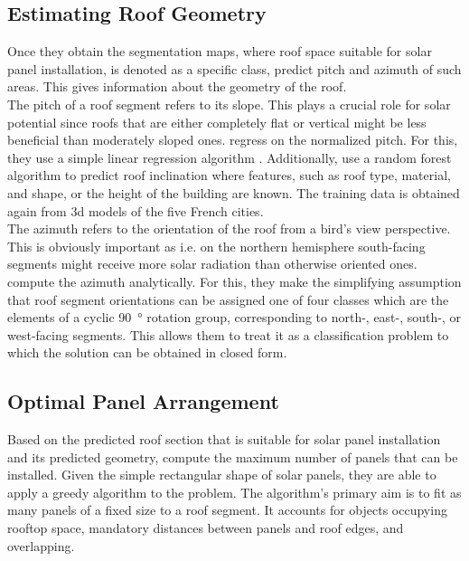 \documentclass{article} %
\begin{document}
\subsection*{Estimating Roof Geometry}
Once they obtain the segmentation maps, where roof space suitable for solar panel installation, is denoted as a specific class, \citet{de2021predicting} predict pitch and azimuth of such areas. This gives information about the geometry of the roof.\\
The pitch of a roof segment refers to its slope. This plays a crucial role for solar potential since roofs that are either completely flat or vertical might be less beneficial than moderately sloped ones. \citet{de2021predicting} regress on the normalized pitch. For this, they use a simple linear regression algorithm \cite{gross2003linear}. Additionally,\citet{de2021predicting} use a random forest algorithm \cite{belgiu2016random} to predict roof inclination where features, such as roof type, material, and shape, or the height of the building are known. The training data is obtained again from 3d models of the five French cities.\\
The azimuth refers to the orientation of the roof from a bird's view perspective. This is obviously important as i.e. on the northern hemisphere south-facing segments might receive more solar radiation than otherwise oriented ones.\\ \citet{de2021predicting} compute the azimuth analytically. For this, they make the simplifying assumption that roof segment orientations can be assigned one of four classes which are the elements of a cyclic \SI{90}{\degree} rotation group, corresponding to north-, east-, south-, or west-facing segments. This allows them to treat it as a classification problem to which the solution can be obtained in closed form.

\subsection*{Optimal Panel Arrangement}
Based on the predicted roof section that is suitable for solar panel installation and its predicted geometry, \citet{de2021predicting} compute the maximum number of panels that can be installed. Given the simple rectangular shape of solar panels, they are able to apply a greedy algorithm to the problem. The algorithm's primary aim is to fit as many panels of a fixed size to a roof segment. It accounts for objects occupying rooftop space, mandatory distances between panels and roof edges, and overlapping.
\end{document}
